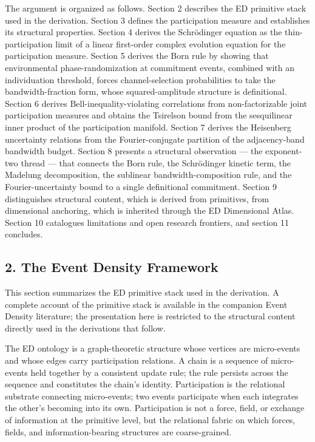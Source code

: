 \documentclass[
  11pt,
]{article}
\begin{document}
The argument is organized as follows. Section 2 describes the ED
primitive stack used in the derivation. Section 3 defines the
participation measure and establishes its structural properties. Section
4 derives the Schrödinger equation as the thin-participation limit of a
linear first-order complex evolution equation for the participation
measure. Section 5 derives the Born rule by showing that environmental
phase-randomization at commitment events, combined with an individuation
threshold, forces channel-selection probabilities to take the
bandwidth-fraction form, whose squared-amplitude structure is
definitional. Section 6 derives Bell-inequality-violating correlations
from non-factorizable joint participation measures and obtains the
Tsirelson bound from the sesquilinear inner product of the participation
manifold. Section 7 derives the Heisenberg uncertainty relations from
the Fourier-conjugate partition of the adjacency-band bandwidth budget.
Section 8 presents a structural observation --- the exponent-two thread
--- that connects the Born rule, the Schrödinger kinetic term, the
Madelung decomposition, the sublinear bandwidth-composition rule, and
the Fourier-uncertainty bound to a single definitional commitment.
Section 9 distinguishes structural content, which is derived from
primitives, from dimensional anchoring, which is inherited through the
ED Dimensional Atlas. Section 10 catalogues limitations and open
research frontiers, and section 11 concludes.

\subsection{2. The Event Density
Framework}\label{the-event-density-framework}

This section summarizes the ED primitive stack used in the derivation. A
complete account of the primitive stack is available in the companion
Event Density literature; the presentation here is restricted to the
structural content directly used in the derivations that follow.

The ED ontology is a graph-theoretic structure whose vertices are
micro-events and whose edges carry participation relations. A chain is a
sequence of micro-events held together by a consistent update rule; the
rule persists across the sequence and constitutes the chain's identity.
Participation is the relational substrate connecting micro-events; two
events participate when each integrates the other's becoming into its
own. Participation is not a force, field, or exchange of information at
the primitive level, but the relational fabric on which forces, fields,
and information-bearing structures are coarse-grained.
\end{document}

